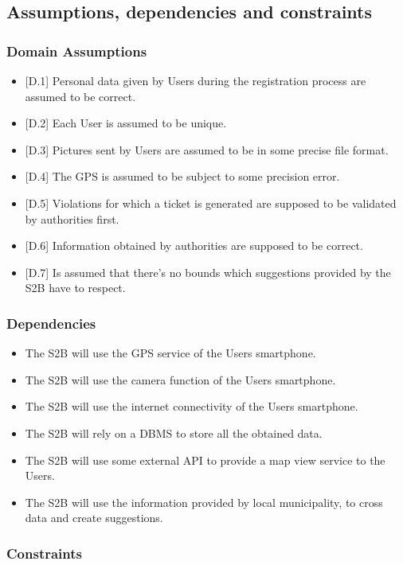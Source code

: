 \subsection{Assumptions,
dependencies
and
constraints}


\subsubsection{Domain Assumptions}
\begin{itemize}
    \item {[D.1]} Personal data given by Users during the registration process are assumed to be correct.
    \item {[D.2]} Each User is assumed to be unique.
    \item {[D.3]} Pictures sent by Users are assumed to be in some precise file format.
    \item {[D.4]} The GPS is assumed to be subject to some precision error.
    \item {[D.5]} Violations for which a ticket is generated are supposed to be validated by authorities first.
    \item {[D.6]} Information obtained by authorities are supposed to be correct.
    \item {[D.7]} Is assumed that there's no bounds which suggestions provided by the S2B have to respect.\\
\end{itemize}

\subsubsection{Dependencies}
\begin{itemize}
    \item The S2B will use the GPS service of the Users smartphone.
    \item The S2B will use the camera function of the Users smartphone.
    \item The S2B will use the internet connectivity of the Users smartphone.
    \item The S2B will rely on a DBMS to store all the obtained data.
    \item The S2B will use some external API to provide  a map view service to the Users.
    \item The S2B will use the information provided by local municipality, to cross data and create suggestions.\\
\end{itemize}


\subsubsection{Constraints}




